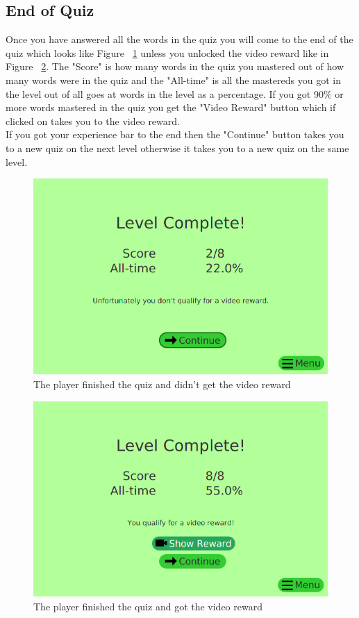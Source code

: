 \documentclass[12pt,a4paper,titlepage,onecolumn]{article}
\begin{document}
		\subsection{End of Quiz}
		Once you have answered all the words in the quiz you will come to the end of the quiz which looks like Figure ~\ref{fig:NewQuizEndNoReward} unless you unlocked the video reward like in Figure ~\ref{fig:NewQuizEndReward}. The "Score" is how many words in the quiz you mastered out of how many words were in the quiz and the "All-time" is all the mastereds you got in the level out of all goes at words in the level as a percentage. If you got 90\% or more words mastered in the quiz you get the "Video Reward" button which if clicked on takes you to the video reward.\\ If you got your experience bar to the end then the "Continue" button takes you to a new quiz on the next level otherwise it takes you to a new quiz on the same level.
		\begin{figure}[h]
		\centering
		\includegraphics[width=1\linewidth]{Figures/NewQuiz/NewQuizEndNoReward}
		\caption[Quiz End without Reward]{The player finished the quiz and didn't get the video reward}
		\label{fig:NewQuizEndNoReward}
		\end{figure}
		\begin{figure}[h]
			\centering
			\includegraphics[width=1\linewidth]{Figures/NewQuiz/NewQuizEndReward}
			\caption[Quiz End with Reward]{The player finished the quiz and got the video reward}
			\label{fig:NewQuizEndReward}
		\end{figure}
\end{document}
